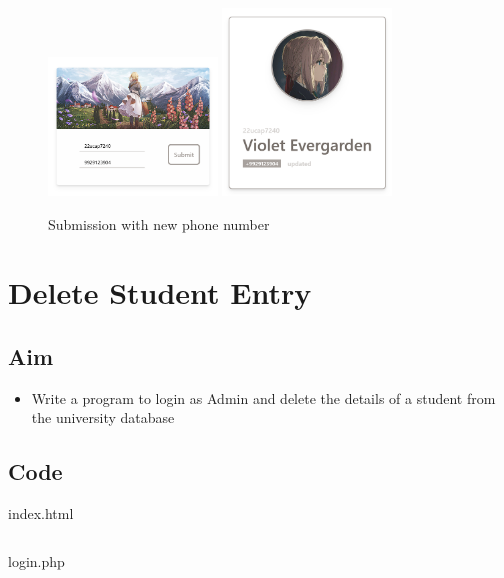 \documentclass{article}
\begin{document}
\newpage
\begin{figure}[h!]
  \centering
  \caption{Submission with new phone number}
  \includegraphics[width=0.4\textwidth]{./Assets/p2603.png}
  \includegraphics[width=0.4\textwidth]{./Assets/p2604.png}
\end{figure}
\newpage
\section{Delete Student Entry}
\subsection{Aim}
\begin{itemize}
  \item Write a program to login as Admin and delete the details of a student from the university database
\end{itemize}

\subsection{Code}
index.html
\inputminted[frame=lines, breaklines, breakanywhere, numberblanklines=false]{html}{./prog_27/index.html}
login.php
\inputminted[frame=lines, breaklines, breakanywhere, numberblanklines=false]{php}{./prog_27/login.php}
\end{document}

